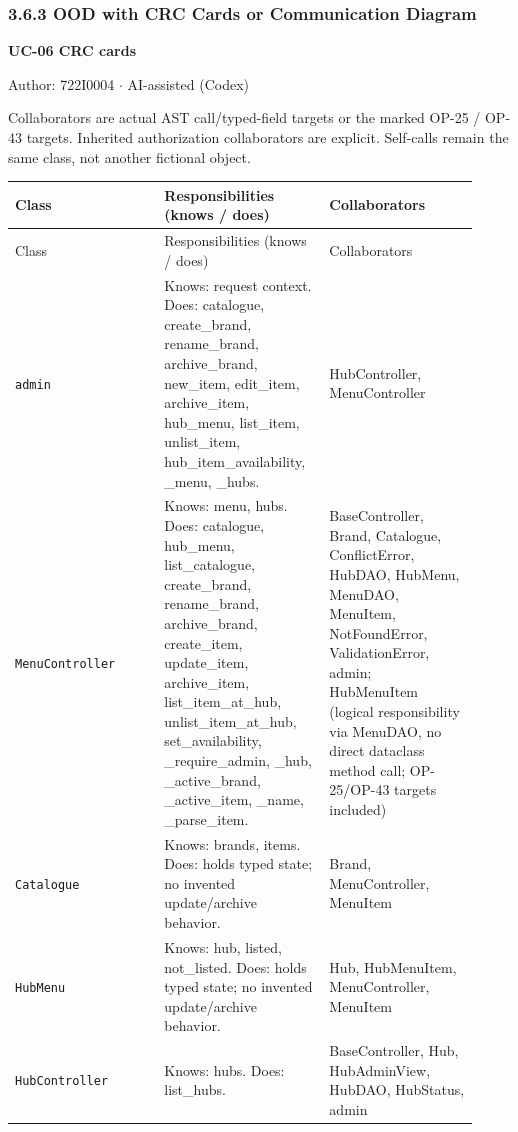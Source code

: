 \subsubsection*{3.6.3 OOD with CRC Cards or Communication Diagram}
\label{CRC-UC-06}
\textbf{UC-06 CRC cards}

Author: 722I0004 \ensuremath{\cdot} AI-assisted (Codex)

Collaborators are actual AST call/typed-field targets or the marked OP-25 / OP-43 targets. Inherited authorization collaborators are explicit. Self-calls remain the same class, not another fictional object.

\begin{longtable}{>{\raggedright\arraybackslash}p{0.3067\linewidth}>{\raggedright\arraybackslash}p{0.3067\linewidth}>{\raggedright\arraybackslash}p{0.3067\linewidth}}
Class & Responsibilities (knows / does) & Collaborators \\
\hline\endfirsthead
Class & Responsibilities (knows / does) & Collaborators \\
\hline\endhead
\texttt{admin} & Knows: request context. Does: catalogue, create\_brand, rename\_brand, archive\_brand, new\_item, edit\_item, archive\_item, hub\_menu, list\_item, unlist\_item, hub\_item\_availability, \_menu, \_hubs. & HubController, MenuController \\
\texttt{MenuController} & Knows: menu, hubs. Does: catalogue, hub\_menu, list\_catalogue, create\_brand, rename\_brand, archive\_brand, create\_item, update\_item, archive\_item, list\_item\_at\_hub, unlist\_item\_at\_hub, set\_availability, \_require\_admin, \_hub, \_active\_brand, \_active\_item, \_name, \_parse\_item. & BaseController, Brand, Catalogue, ConflictError, HubDAO, HubMenu, MenuDAO, MenuItem, NotFoundError, ValidationError, admin; HubMenuItem (logical responsibility via MenuDAO, no direct dataclass method call; OP-25/OP-43 targets  included) \\
\texttt{Catalogue} & Knows: brands, items. Does: holds typed state; no invented update/archive behavior. & Brand, MenuController, MenuItem \\
\texttt{HubMenu} & Knows: hub, listed, not\_listed. Does: holds typed state; no invented update/archive behavior. & Hub, HubMenuItem, MenuController, MenuItem \\
\texttt{HubController} & Knows: hubs. Does: list\_hubs. & BaseController, Hub, HubAdminView, HubDAO, HubStatus, admin \\

\end{longtable}
